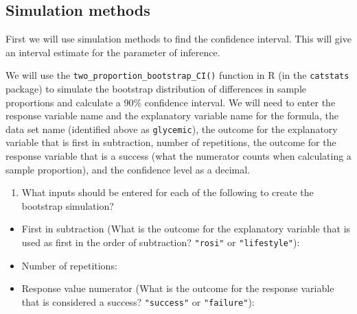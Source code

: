 \documentclass[
]{report}
\providecommand{\tightlist}{%
  \setlength{\itemsep}{0pt}\setlength{\parskip}{0pt}}
\begin{document}
\subsection*{Simulation methods}\label{simulation-methods-1}

First we will use simulation methods to find the confidence interval. This will give an interval estimate for the parameter of inference.

We will use the \texttt{two\_proportion\_bootstrap\_CI()} function in R (in the \texttt{catstats} package) to simulate the bootstrap distribution of differences in sample proportions and calculate a 90\% confidence interval. We will need to enter the response variable name and the explanatory variable name for the formula, the data set name (identified above as \texttt{glycemic}), the outcome for the explanatory variable that is first in subtraction, number of repetitions, the outcome for the response variable that is a success (what the numerator counts when calculating a sample proportion), and the confidence level as a decimal.

\begin{enumerate}
\def\labelenumi{\arabic{enumi}.}
\setcounter{enumi}{6}
\tightlist
\item
  What inputs should be entered for each of the following to create the bootstrap simulation?
  \vspace{1mm}
\end{enumerate}

\begin{itemize}
\tightlist
\item
  First in subtraction (What is the outcome for the explanatory variable that is used as first in the order of subtraction? \texttt{"rosi"} or \texttt{"lifestyle"}):
\end{itemize}

\vspace{.15in}

\begin{itemize}
\tightlist
\item
  Number of repetitions:
\end{itemize}

\vspace{.15in}

\begin{itemize}
\tightlist
\item
  Response value numerator (What is the outcome for the response variable that is considered a success? \texttt{"success"} or \texttt{"failure"}):
\end{itemize}
\end{document}
